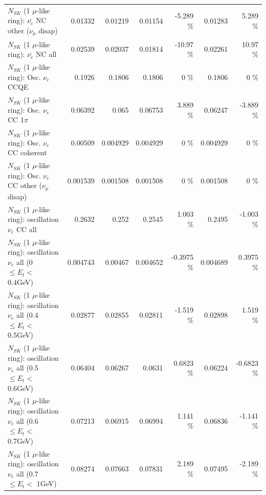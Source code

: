 \begin{table}
\begin{tabular}{| l | r | r | r  r | r  r |}
          $N_{SK}$ (1 $\mu$-like ring): $\bar{\nu_e}$ NC other ($\nu_\mu$ disap) &         0.01332 &         0.01219 &         0.01154 &   -5.289 \%  &         0.01283 &    5.289 \%  \\ 
                            $N_{SK}$ (1 $\mu$-like ring): $\bar{\nu_{e}}$ NC all &         0.02539 &         0.02037 &         0.01814 &   -10.97 \%  &         0.02261 &    10.97 \%  \\ 
\hline
\hline
\hline
                                 $N_{SK}$ (1 $\mu$-like ring): Osc. $\nu_e$ CCQE &          0.1926 &          0.1806 &          0.1806 &        0 \%  &          0.1806 &        0 \%  \\ 
                            $N_{SK}$ (1 $\mu$-like ring): Osc. $\nu_e$ CC 1$\pi$ &         0.06392 &           0.065 &         0.06753 &    3.889 \%  &         0.06247 &   -3.889 \%  \\ 
                          $N_{SK}$ (1 $\mu$-like ring): Osc. $\nu_e$ CC coherent &         0.00509 &        0.004929 &        0.004929 &        0 \%  &        0.004929 &        0 \%  \\ 
           $N_{SK}$ (1 $\mu$-like ring): Osc. $\nu_e$ CC other ($\nu_\mu$ disap) &        0.001539 &        0.001508 &        0.001508 &        0 \%  &        0.001508 &        0 \%  \\ 
                        $N_{SK}$ (1 $\mu$-like ring): oscillation $\nu_e$ CC all &          0.2632 &           0.252 &          0.2545 &    1.003 \%  &          0.2495 &   -1.003 \%  \\ 
\hline
$N_{SK}$ (1 $\mu$-like ring): oscillation $\nu_{e}$ all (0 $\leq E_{t} <$ 0.4GeV) &        0.004743 &         0.00467 &        0.004652 &  -0.3975 \%  &        0.004689 &   0.3975 \%  \\ 
$N_{SK}$ (1 $\mu$-like ring): oscillation $\nu_{e}$ all (0.4 $\leq E_{t} <$ 0.5GeV) &         0.02877 &         0.02855 &         0.02811 &   -1.519 \%  &         0.02898 &    1.519 \%  \\ 
$N_{SK}$ (1 $\mu$-like ring): oscillation $\nu_{e}$ all (0.5 $\leq E_{t} <$ 0.6GeV) &         0.06404 &         0.06267 &          0.0631 &   0.6823 \%  &         0.06224 &  -0.6823 \%  \\ 
$N_{SK}$ (1 $\mu$-like ring): oscillation $\nu_{e}$ all (0.6 $\leq E_{t} <$ 0.7GeV) &         0.07213 &         0.06915 &         0.06994 &    1.141 \%  &         0.06836 &   -1.141 \%  \\ 
$N_{SK}$ (1 $\mu$-like ring): oscillation $\nu_{e}$ all (0.7 $\leq E_{t} <$ 1GeV) &         0.08274 &         0.07663 &         0.07831 &    2.189 \%  &         0.07495 &   -2.189 \%  \\ 

\end{tabular}
\end{table}
